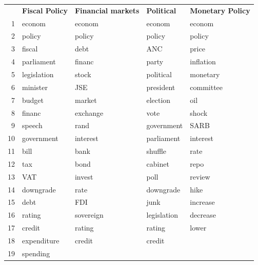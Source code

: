 \documentclass[11pt,preprint, authoryear]{elsarticle}
\let\origtable\table
\let\endorigtable\endtable
\renewenvironment{table}[1][2] {
    \expandafter\origtable\expandafter[H]
} {
    \endorigtable
}
\numberwithin{equation}{section}
\numberwithin{figure}{section}
\numberwithin{table}{section}
\begin{document}
\begin{table}[H]\footnotesize
	\caption{Keywords per Index category \label{tbl_keywords}} 
	\centering
	\begin{tabular}{rlrrr}
		\cmidrule{1-5}          & \textbf{Fiscal Policy } & \multicolumn{1}{l}{\textbf{Financial markets }} & \multicolumn{1}{l}{\textbf{Political}} & \multicolumn{1}{l}{\textbf{Monetary Policy }} \\
		\cmidrule{1-5}    1     & econom & \multicolumn{1}{l}{econom} & \multicolumn{1}{l}{econom} & \multicolumn{1}{l}{econom} \\
		2     & policy & \multicolumn{1}{l}{policy} & \multicolumn{1}{l}{policy} & \multicolumn{1}{l}{policy} \\
		3     & fiscal & \multicolumn{1}{l}{debt} & \multicolumn{1}{l}{ANC} & \multicolumn{1}{l}{price} \\
		4     & parliament & \multicolumn{1}{l}{financ} & \multicolumn{1}{l}{party} & \multicolumn{1}{l}{inflation} \\
		5     & legislation & \multicolumn{1}{l}{stock} & \multicolumn{1}{l}{political} & \multicolumn{1}{l}{monetary} \\
		6     & minister & \multicolumn{1}{l}{JSE} & \multicolumn{1}{l}{president} & \multicolumn{1}{l}{committee} \\
		7     & budget & \multicolumn{1}{l}{market} & \multicolumn{1}{l}{election} & \multicolumn{1}{l}{oil} \\
		8     & financ & \multicolumn{1}{l}{exchange} & \multicolumn{1}{l}{vote} & \multicolumn{1}{l}{shock} \\
		9     & speech & \multicolumn{1}{l}{rand} & \multicolumn{1}{l}{government } & \multicolumn{1}{l}{SARB} \\
		10    & government & \multicolumn{1}{l}{interest} & \multicolumn{1}{l}{parliament} & \multicolumn{1}{l}{interest} \\
		11    & bill  & \multicolumn{1}{l}{bank } & \multicolumn{1}{l}{shuffle} & \multicolumn{1}{l}{rate} \\
		12    & tax   & \multicolumn{1}{l}{bond} & \multicolumn{1}{l}{cabinet} & \multicolumn{1}{l}{repo} \\
		13    & VAT   & \multicolumn{1}{l}{invest} & \multicolumn{1}{l}{poll} & \multicolumn{1}{l}{review} \\
		14    & downgrade & \multicolumn{1}{l}{rate} & \multicolumn{1}{l}{downgrade} & \multicolumn{1}{l}{hike} \\
		15    & debt  & \multicolumn{1}{l}{FDI} & \multicolumn{1}{l}{junk} & \multicolumn{1}{l}{increase} \\
		16    & rating & \multicolumn{1}{l}{sovereign} & \multicolumn{1}{l}{legislation} & \multicolumn{1}{l}{decrease} \\
		17    & credit & \multicolumn{1}{l}{rating} & \multicolumn{1}{l}{rating} & \multicolumn{1}{l}{lower} \\
		18    & expenditure & \multicolumn{1}{l}{credit} & \multicolumn{1}{l}{credit} &  \\
		19    & spending &       &       &  \\
		\bottomrule
	\end{tabular}
\end{table}
\end{document}

